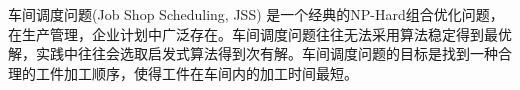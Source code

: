 车间调度问题(Job Shop Scheduling, JSS) 是一个经典的NP-Hard组合优化问题，在生产管理，企业计划中广泛存在。车间调度问题往往无法采用算法稳定得到最优解，实践中往往会选取启发式算法得到次有解。车间调度问题的目标是找到一种合理的工件加工顺序，使得工件在车间内的加工时间最短。

